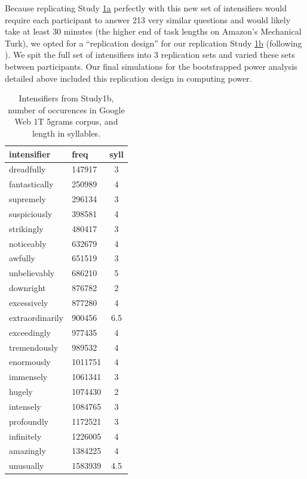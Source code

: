 \documentclass[10pt,letterpaper]{article}
\begin{document}
Because replicating Study \hyperref[sec:study1a]{1a} perfectly with this new set of intensifiers would require each participant to answer 213 very similar questions and would likely take at least 30 minutes (the higher end of task lengths on Amazon’s Mechanical Turk), we opted for a ``replication design'' for our replication Study \hyperref[sec:study1b]{1b} (following ). We spit the full set of intensifiers into 3 replication sets and varied these sets between participants. Our final simulations for the bootstrapped power analysis detailed above included this replication design in computing power.

\begin{table}[ht]
 \begin{center}
 \footnotesize
  \caption{Intensifiers from Study1b, number of occurences in Google Web 1T 5grams corpus, and length in syllables.}
  \label{table:intensifiers_study1b}
  \begin{tabular}{llc}
   \hline
   intensifier & freq & syll \\
   \hline
    dreadfully & 147917 & 3 \\ 
    fantastically & 250989 & 4 \\ 
    supremely & 296134 & 3 \\ 
    suspiciously & 398581 & 4 \\ 
    strikingly & 480417 & 3 \\ 
    noticeably & 632679 & 4 \\ 
    awfully & 651519 & 3 \\ 
    unbelievably & 686210 & 5 \\ 
    downright & 876782 & 2 \\ 
    excessively & 877280 & 4 \\ 
    extraordinarily & 900456 & 6.5 \\ 
    exceedingly & 977435 & 4 \\ 
    tremendously & 989532 & 4 \\ 
    enormously & 1011751 & 4 \\ 
    immensely & 1061341 & 3 \\ 
    hugely & 1074430 & 2 \\ 
    intensely & 1084765 & 3 \\ 
    profoundly & 1172521 & 3 \\ 
    infinitely & 1226005 & 4 \\ 
    amazingly & 1384225 & 4 \\ 
    unusually & 1583939 & 4.5 \\ 

\end{tabular}
\end{center}
\end{table}
\end{document}
